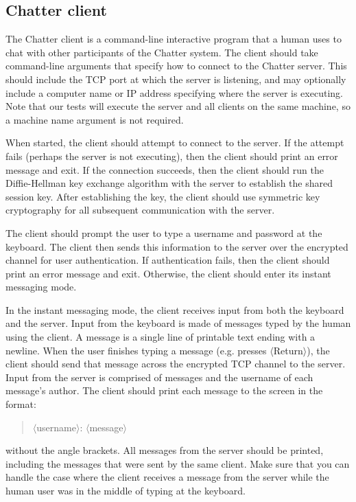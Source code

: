 \documentclass[letterpaper]{article}
\begin{document}
\subsection*{Chatter client}

The Chatter client is a command-line interactive program that a human uses to chat
with other participants of the Chatter system. The client should take command-line
arguments that specify how to connect to the Chatter server. This should include the
TCP port at which the server is listening, and may optionally include a computer
name or IP address specifying where the server is executing. Note that our tests will
execute the server and all clients on the same machine, so a machine name
argument is not required.

When started, the client should attempt to connect to the server. If the attempt fails
(perhaps the server is not executing), then the client should print an error message
and exit. If the connection succeeds, then the client should run the Diffie-Hellman
key exchange algorithm with the server to establish the shared session key. After
establishing the key, the client should use symmetric key cryptography for all
subsequent communication with the server.

The client should prompt the user to type a username and password at the
keyboard. The client then sends this information to the server over the encrypted
channel for user authentication. If authentication fails, then the client should print
an error message and exit. Otherwise, the client should enter its instant messaging
mode.

In the instant messaging mode, the client receives input from both the keyboard and
the server. Input from the keyboard is made of messages typed by the human using
the client. A message is a single line of printable text ending with a newline. When
the user finishes typing a message (e.g. presses $\langle$Return$\rangle$), the client should send
that message across the encrypted TCP channel to the server.
Input from the server is comprised of messages and the username of each message's
author. The client should print each message to the screen in the format:
\begin{quote}
$\langle$username$\rangle$: $\langle$message$\rangle$
\end{quote}
without the angle brackets. All messages from the server should be printed,
including the messages that were sent by the same client. Make sure that you can
handle the case where the client receives a message from the server while the
human user was in the middle of typing at the keyboard.
\end{document}
